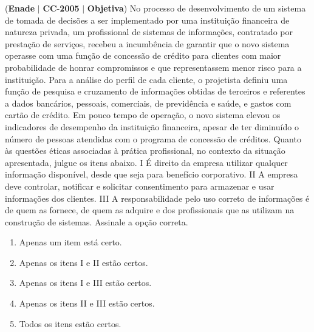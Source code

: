 \documentclass{exam}
\begin{document}
\begin{questions}
\question (\textbf{Enade} $|$ \textbf{CC}-\textbf{2005} $|$ \textbf{Objetiva})
No processo de desenvolvimento de um sistema de
tomada de decisões a ser implementado por uma
instituição financeira de natureza privada, um profissional
de sistemas de informações, contratado por prestação de
serviços, recebeu a incumbência de garantir que o novo
sistema operasse com uma função de concessão de crédito
para clientes com maior probabilidade de honrar
compromissos e que representassem menor risco para a
instituição. Para a análise do perfil de cada cliente, o
projetista definiu uma função de pesquisa e cruzamento
de informações obtidas de terceiros e referentes a dados
bancários, pessoais, comerciais, de previdência e saúde, e
gastos com cartão de crédito. Em pouco tempo de
operação, o novo sistema elevou os indicadores de
desempenho da instituição financeira, apesar de ter
diminuído o número de pessoas atendidas com o
programa de concessão de créditos.
Quanto às questões éticas associadas à prática profissional, no
contexto da situação apresentada, julgue os itens abaixo.
I É direito da empresa utilizar qualquer informação
disponível, desde que seja para benefício corporativo.
II A empresa deve controlar, notificar e solicitar
consentimento para armazenar e usar informações dos
clientes.
III A responsabilidade pelo uso correto de informações é de
quem as fornece, de quem as adquire e dos profissionais que
as utilizam na construção de sistemas.
Assinale a opção correta.
	\begin{enumerate}[label=\alph*)]
		\item  Apenas um item está certo.
		\item  Apenas os itens I e II estão certos.
		\item  Apenas os itens I e III estão certos.
		\item  Apenas os itens II e III estão certos.
		\item  Todos os itens estão certos.
	\end{enumerate}


\end{questions}
\end{document}
